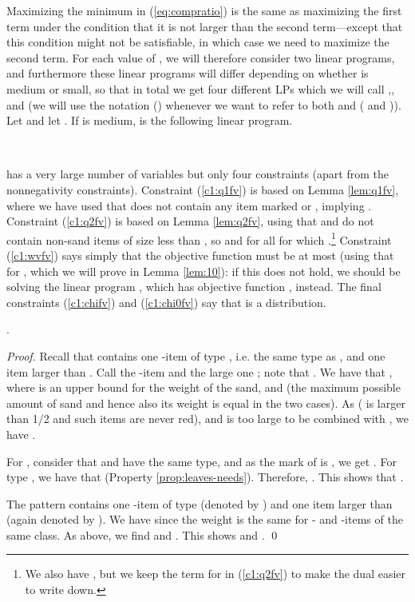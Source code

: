 Maximizing the minimum in (\ref{eq:compratio}) is the same as maximizing the first
term under the condition that it is not larger than the second term---except that
this condition might not be satisfiable, in which case we need to maximize the
second term. For each value of , we will therefore consider two linear programs, and furthermore these linear programs will differ depending on whether  is medium or small, so that in total we get four different LPs which we will call
,,  and  (we will use the notation  () whenever we want to refer to both  and  ( and )). Let 
and let . 
If  is medium,  is the following linear program.

\LPblocktag{}{\label{linprog:lp1}}\begin{minipage}{\linewidth-2cm}
	~
\end{minipage}
 has a very large number of variables
but only four constraints (apart from the nonnegativity constraints).
Constraint (\ref{c1:q1fv}) is based on Lemma \ref{lem:q1fv}, where we have used that
 does not contain any item marked  or , implying . Constraint
(\ref{c1:q2fv}) is based on Lemma \ref{lem:q2fv}, using that  and  do not
contain non-sand items of size less than , so  and  for all  for which
.\footnote{We also have , but we keep the term for  in (\ref{c1:q2fv}) to make the dual easier to write down.} Constraint (\ref{c1:wvfv}) says
simply that the objective function must be at most  (using that  for , which we will prove in Lemma \ref{lem:10}):
if this does not hold, we should be solving the linear program , which has
objective function , instead. The final constraints (\ref{c1:chifv}) 
and (\ref{c1:chi0fv}) say that  is a distribution.

\begin{lemma}
	\label{lem:10}
	.
\end{lemma}
\begin{proof}
	Recall that  contains one -item of type , i.e. the same type as , and one item larger than . Call the -item  and the large one ; note that . We have that , where  is an upper bound for the weight of the sand, and  (the maximum possible amount of sand and hence also its weight is equal in the two cases). As   ( is larger than 1/2 and such items are never red), and  is too large to be combined with , 
	we have . 
	
	For , consider that  and  have the same type, and as the mark of  is , we get .
	For type , we have that  (Property \ref{prop:leaves-needs}). Therefore, .
	This shows that .
	
	The pattern  contains one -item of type  (denoted by ) and one item larger than  (again denoted by ). 
	We have  since the weight  is the same for - and -items of the same class. As above, we find   and 
	.
	This shows  and .
	\qed\end{proof}


